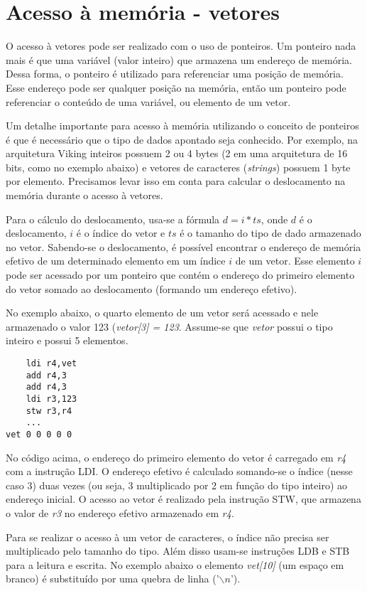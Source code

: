 \documentclass{extreport}
\begin{document}
\section{Acesso à memória - vetores}

O acesso à vetores pode ser realizado com o uso de ponteiros. Um ponteiro nada mais é que uma variável (valor inteiro) que armazena um endereço de memória. Dessa forma, o ponteiro é utilizado para referenciar uma posição de memória. Esse endereço pode ser qualquer posição na memória, então um ponteiro pode referenciar o conteúdo de uma variável, ou elemento de um vetor.

Um detalhe importante para acesso à memória utilizando o conceito de ponteiros é que é necessário que o tipo de dados apontado seja conhecido. Por exemplo, na arquitetura Viking inteiros possuem 2 ou 4 bytes (2 em uma arquitetura de 16 bits, como no exemplo abaixo) e vetores de caracteres (\textit{strings}) possuem 1 byte por elemento. Precisamos levar isso em conta para calcular o deslocamento na memória durante o acesso à vetores.

Para o cálculo do deslocamento, usa-se a fórmula $d = i * ts$, onde $d$ é o deslocamento, $i$ é o índice do vetor e $ts$ é o tamanho do tipo de dado armazenado no vetor. Sabendo-se o deslocamento, é possível encontrar o endereço de memória efetivo de um determinado elemento em um índice $i$ de um vetor. Esse elemento $i$ pode ser acessado por um ponteiro que contém o endereço do primeiro elemento do vetor somado ao deslocamento (formando um endereço efetivo).

No exemplo abaixo, o quarto elemento de um vetor será acessado e nele armazenado o valor 123 (\textit{vetor[3] = 123}. Assume-se que \textit{vetor} possui o tipo inteiro e possui 5 elementos.

\begin{verbatim}
    ldi r4,vet
    add r4,3
    add r4,3
    ldi r3,123
    stw r3,r4
    ...
vet 0 0 0 0 0
\end{verbatim}

No código acima, o endereço do primeiro elemento do vetor é carregado em \textit{r4} com a instrução LDI. O endereço efetivo é calculado somando-se o índice (nesse caso 3) duas vezes (ou seja, 3 multiplicado por 2 em função do tipo inteiro) ao endereço inicial. O acesso ao vetor é realizado pela instrução STW, que armazena o valor de \textit{r3} no endereço efetivo armazenado em \textit{r4}.

Para se realizar o acesso à um vetor de caracteres, o índice não precisa ser multiplicado pelo tamanho do tipo. Além disso usam-se instruções LDB e STB para a leitura e escrita. No exemplo abaixo o elemento \textit{vet[10]} (um espaço em branco) é substituído por uma quebra de linha ('$\backslash n$').
\end{document}
